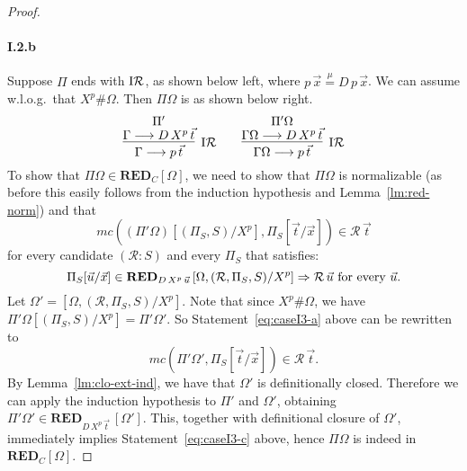 \documentclass[preprint]{elsarticle}
\def\Rscr{{\mathcal R}}
\newcommand{\Seq}[2]{#1\longrightarrow #2}
\newcommand{\defmu}{\stackrel{\mu}{=}}
\newcommand{\indR}{{\rm I}{\cal R}}
\def\RED{{\mathbf{RED}}}
\begin{document}
\begin{proof}
\paragraph{\bf I.2.b} Suppose $\Pi$ ends with $\indR$,
as shown below left, where $p\,\vec x \defmu D\,p\,\vec x$. 
We can assume w.l.o.g.\  that $X^p \# \Omega$. Then $\Pi\Omega$ is
as shown below right.
$$
\infer[\indR] {\Seq{\Gamma}{p\,\vec t}} { \deduce{\Seq \Gamma
    {D\,X^p\,\vec t}}{\Pi'} }
\qquad
\infer[\indR] {\Seq{\Gamma\Omega}{p\,\vec t}} { \deduce{\Seq
    {\Gamma\Omega}{D\,X^p \,\vec t}}{\Pi'\Omega} }
$$
To show that $\Pi\Omega \in \RED_C[\Omega]$, we need to show that
$\Pi\Omega$ is normalizable (as before this easily follows from the induction
hypothesis and Lemma~\ref{lm:red-norm}) and that
\begin{equation}
  \label{eq:caseI3-a}
  mc((\Pi'\Omega)[(\Pi_S,S)/X^p], \Pi_S[\vec t/\vec x]) \in \Rscr\,\vec t
\end{equation}
for every candidate $(\Rscr : S)$ and every $\Pi_S$ that satisfies:
\begin{equation}
  \label{eq:caseI3-b}
  \Pi_S[\vec u/\vec x] \in \RED_{D\,X^p\,\vec u}\, [\Omega, (\Rscr,\Pi_S,S)/X^p]
  \Rightarrow \Rscr\,\vec u
  \hbox{ for every $\vec u$.}
\end{equation}
Let $\Omega' = [\Omega, (\Rscr, \Pi_S, S)/X^p]$.  Note that since $X^p
\# \Omega$, we have
$
\Pi'\Omega[(\Pi_S,S)/X^p] = \Pi'\Omega'.
$
So Statement~\ref{eq:caseI3-a} above can be rewritten to
\begin{equation}
  \label{eq:caseI3-c}
  mc(\Pi'\Omega', \Pi_S[\vec t/\vec x]) \in \Rscr\,\vec t. 
\end{equation}
By Lemma~\ref{lm:clo-ext-ind}, we have that $\Omega'$ is
definitionally closed.  Therefore we can apply the induction
hypothesis to $\Pi'$ and $\Omega'$, obtaining $\Pi'\Omega' \in
\RED_{D\,X^p\,\vec t}\, [\Omega']$. This, together with definitional
closure of $\Omega'$, immediately implies Statement~\ref{eq:caseI3-c}
above, hence $\Pi\Omega$ is indeed in $\RED_C[\Omega]$.


\end{proof}
\end{document}
